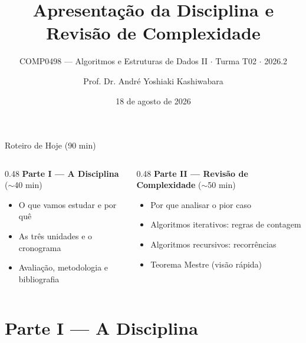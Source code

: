 \documentclass[aspectratio=169]{beamer}
\title{Apresentação da Disciplina e Revisão de Complexidade}
\subtitle{COMP0498 --- Algoritmos e Estruturas de Dados II $\cdot$ Turma T02 $\cdot$ 2026.2}
\author[Prof. André <andreyoshiaki@dcomp.ufs.br>]{Prof. Dr. André Yoshiaki Kashiwabara}
\institute{DCOMP --- Universidade Federal de Sergipe}
\date{18 de agosto de 2026}
\begin{document}
\begin{frame}[plain]
  \vspace{-2mm}
  \titlepage
\end{frame}

\begin{frame}{Roteiro de Hoje (90 min)}
  \begin{columns}[T]
    \begin{column}{0.48\textwidth}
      \textbf{Parte I --- A Disciplina} {\color{UFSGray}($\sim$40 min)}
      \begin{itemize}
        \item O que vamos estudar e por quê
        \item As três unidades e o cronograma
        \item Avaliação, metodologia e bibliografia
      \end{itemize}
    \end{column}
    \begin{column}{0.48\textwidth}
      \textbf{Parte II --- Revisão de Complexidade} {\color{UFSGray}($\sim$50 min)}
      \begin{itemize}
        \item Por que analisar o pior caso
        \item Algoritmos iterativos: regras de contagem
        \item Algoritmos recursivos: recorrências
        \item Teorema Mestre (visão rápida)
      \end{itemize}
    \end{column}
  \end{columns}
\end{frame}

\section{Parte I --- A Disciplina}
\end{document}
